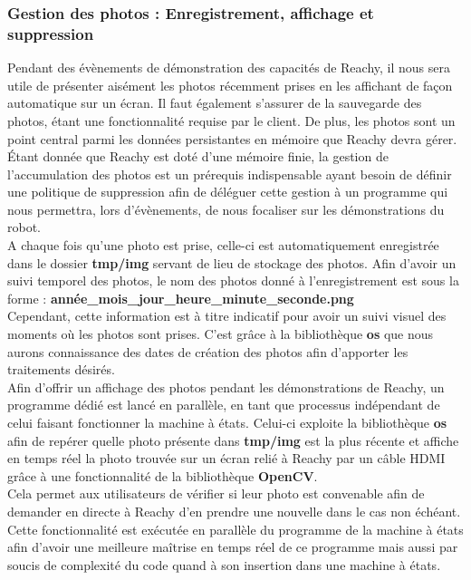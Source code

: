 \documentclass[a4paper,french]{article}
\begin{document}
\subsubsection{Gestion des photos : Enregistrement, affichage et suppression}
Pendant des évènements de démonstration des capacités de Reachy, il nous sera utile de présenter aisément les photos récemment prises en les affichant de façon automatique sur un écran. Il faut également s'assurer de la sauvegarde des photos, étant une fonctionnalité requise par le client. De plus, les photos sont un point central parmi les données persistantes en mémoire que Reachy devra gérer. \'Etant donnée que Reachy est doté d'une mémoire finie, la gestion de l'accumulation des photos est un prérequis indispensable ayant besoin de définir une politique de suppression afin de déléguer cette gestion à un programme qui nous permettra, lors d'évènements, de nous focaliser sur les démonstrations du robot.\\

A chaque fois qu'une photo est prise, celle-ci est automatiquement enregistrée dans le dossier \textbf{tmp/img} servant de lieu de stockage des photos. Afin d'avoir un suivi temporel des photos, le nom des photos donné à l'enregistrement est sous la forme : \textbf{année\_mois\_jour\_heure\_minute\_seconde.png}\\
Cependant, cette information est à titre indicatif pour avoir un suivi visuel des moments où les photos sont prises. C'est grâce à la bibliothèque \textbf{os} que nous aurons connaissance des dates de création des photos afin d'apporter les traitements désirés.\\

Afin d'offrir un affichage des photos pendant les démonstrations de Reachy, un programme dédié est lancé en parallèle, en tant que processus indépendant de celui faisant fonctionner la machine à états. Celui-ci exploite la bibliothèque \textbf{os} afin de repérer quelle photo présente dans \textbf{tmp/img} est la plus récente et affiche en temps réel la photo trouvée sur un écran relié à Reachy par un câble HDMI grâce à une fonctionnalité de la bibliothèque \textbf{OpenCV}.\\
Cela permet aux utilisateurs de vérifier si leur photo est convenable afin de demander en directe à Reachy d'en prendre une nouvelle dans le cas non échéant. Cette fonctionnalité est exécutée en parallèle du programme de la machine à états afin d'avoir une meilleure maîtrise en temps réel de ce programme mais aussi par soucis de complexité du code quand à son insertion dans une machine à états.\\
\end{document}
